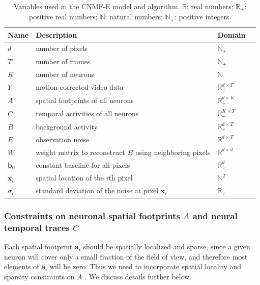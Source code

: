 \documentclass[9pt,lineno]{elife}
\begin{document}
\begin{table}[!t]
  \centering
  \begin{tabular}{llll}
    \toprule
    \cmidrule{1-2}
    Name     & Description     &  Domain \\
    \midrule
    $d$ & number of pixels &  $\mathbb{N}_+$  \\
    $T$ & number of frames &  $\mathbb{N}_+$  \\
    $K$ & number of neurons &  $\mathbb{N}$  \\
    $Y$ & motion corrected video data & $\mathbb{R}_+^{d\times T}$     \\
    $A$ & spatial footprints of all neurons  & $\mathbb{R}_+^{d\times K}$   \\
    $C$ & temporal activities of all neurons & $\mathbb{R}_+^{K\times T}$  \\
    $B$ & background activity & $\mathbb{R}_+^{d\times T}$ \\
    $E$ & observation noise & $\mathbb{R}^{d\times T}$  \\
    $W$ & weight matrix to reconstruct $B$ using neighboring pixels& $\mathbb{R}^{d\times d}$  \\
    $\bm{b}_0$ & constant baseline for all pixels & $\mathbb{R}_+^{d}$  \\
    $\bm{x}_i$ & spatial location of the $i$th pixel & $\mathbb{N}^2$ \\
    $\sigma_i$ & standard deviation of the noise at  pixel $\bm{x}_i$ & $\mathbb{R}_+$  \\
    \bottomrule
  \end{tabular} 
    \caption{Variables used in the CNMF-E model and algorithm. $\mathbb{R}$: real numbers; $\mathbb{R}_+$: positive real numbers; $\mathbb{N}$: natural numbers; $\mathbb{N}_+$: positive integers. }
  \label{table:variables and notations}
\end{table}

\subsubsection{Constraints on neuronal spatial footprints \texorpdfstring{$A$}{Lg} and neural temporal traces \texorpdfstring{$C$}{Lg}}
Each spatial footprint $\bm{a}_i$ should be spatially localized and sparse, since a given neuron will cover only a small fraction of the field of view, and therefore most elements of $\bm{a}_i$ will be zero.  Thus we need to incorporate spatial locality and sparsity constraints on $A$ \citep{Pnevmatikakis2016}. We discuss details further below.
\end{document}
